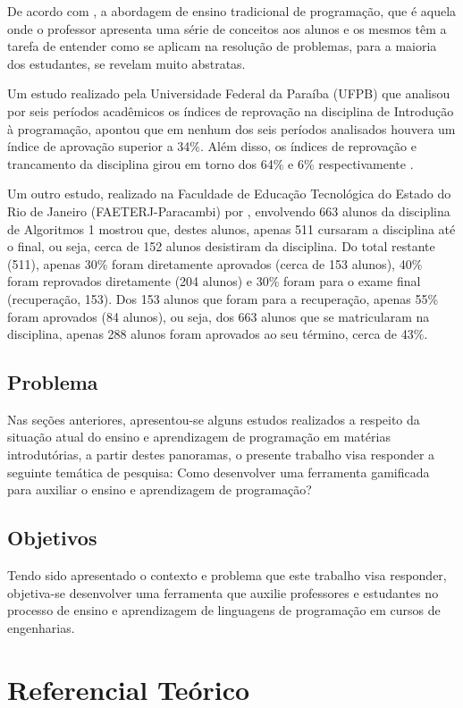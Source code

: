 De acordo com \cite{de2009visualg}, a abordagem de ensino tradicional de programação, que é aquela onde o professor apresenta
uma série de conceitos aos alunos e os mesmos têm a tarefa de entender como se aplicam na resolução de problemas,
para a maioria dos estudantes, se revelam muito abstratas.

Um estudo realizado pela Universidade Federal da Paraíba (UFPB) que analisou por seis períodos 
acadêmicos os índices de reprovação na disciplina de Introdução à programação, apontou que 
em nenhum dos seis períodos analisados houvera um índice de aprovação superior a 34\%. Além disso,
os índices de reprovação e trancamento da disciplina girou em torno dos 64\% e 6\% respectivamente \cite{SBIE6739}.

Um outro estudo, realizado na Faculdade de Educação Tecnológica do Estado do Rio de Janeiro (FAETERJ-Paracambi) por \cite{vieira2015dificuldades}, 
envolvendo 663 alunos da disciplina de Algoritmos 1 mostrou que, destes alunos, apenas 511 cursaram a disciplina 
até o final, ou seja, cerca de 152 alunos desistiram da disciplina. Do total restante (511), apenas 30\% foram
diretamente aprovados (cerca de 153 alunos), 40\% foram reprovados diretamente (204 alunos) e 30\% foram para o exame final (recuperação, 153).
Dos 153 alunos que foram para a recuperação, apenas 55\% foram aprovados (84 alunos), ou seja, dos 663 alunos que
se matricularam na disciplina, apenas  288 alunos foram aprovados ao seu término, cerca de 43\%.

\section{Problema}
Nas seções anteriores, apresentou-se alguns estudos realizados a respeito da situação atual do ensino e aprendizagem
de programação em matérias introdutórias, a partir destes panoramas, o presente trabalho visa responder a seguinte temática
de pesquisa:
Como desenvolver uma ferramenta gamificada para auxiliar o ensino e aprendizagem de programação?
 
\section{Objetivos}
Tendo sido apresentado o contexto e problema que este trabalho visa responder, objetiva-se
desenvolver uma ferramenta que auxilie professores e estudantes no processo de ensino e aprendizagem
de linguagens de programação em cursos de engenharias.

\chapter{Referencial Teórico}


